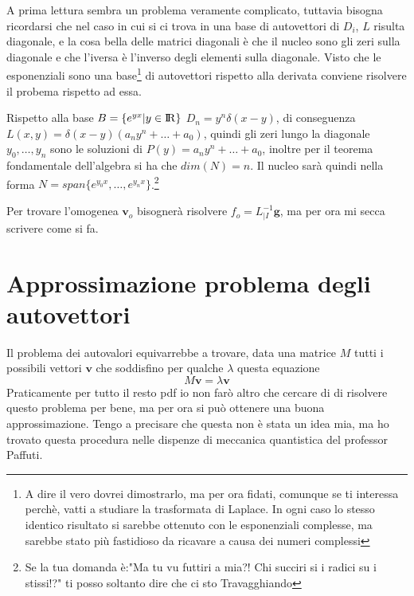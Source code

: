 \documentclass[11pt,a4paper]{report}
\newcommand{\vettore}[1]{\mathbf{#1}}
\theoremstyle{definition}
\theoremstyle{plain}
\theoremstyle{plain}
\begin{document}
			A prima lettura sembra un problema veramente complicato, tuttavia bisogna ricordarsi che nel caso in cui si ci trova in una base di autovettori di $D_i$, $L$ risulta diagonale, e la cosa bella delle matrici diagonali è che il nucleo sono gli zeri sulla diagonale e che l'iversa è l'inverso degli elementi sulla diagonale.\newline
			Visto che le esponenziali sono una base\footnote{A dire il vero dovrei dimostrarlo, ma per ora fidati, comunque se ti interessa perchè, vatti a studiare la trasformata di Laplace. In ogni caso lo stesso identico risultato si sarebbe ottenuto con le esponenziali complesse, ma sarebbe stato più fastidioso da ricavare a causa dei numeri complessi} di autovettori rispetto alla derivata conviene risolvere il probema rispetto ad essa.\newline

			Rispetto alla base $B=\{e^{yx}|y \in \rm I\!R\}$ $D_n=y^n\delta(x-y)$, di conseguenza $L(x,y)=\delta(x-y)(a_ny^n+\dots+a_0)$, quindi gli zeri lungo la diagonale $y_0,\dots,y_n$ sono le soluzioni di $P(y)=a_ny^n+\dots+a_0$, inoltre per il teorema fondamentale dell'algebra si ha che $dim(N)=n$. Il nucleo sarà quindi nella forma $N=span\{e^{y_0x},\dots,e^{y_nx}\}$.\footnote{Se la tua domanda è:"Ma tu vu futtiri a mia?! Chi succiri si i radici su i stissi!?" ti posso soltanto dire che ci sto Travagghiando}\newline

			Per trovare l'omogenea $\vettore v_o$ bisognerà risolvere $f_o=L^{-1}_{|I}\vettore g$, ma per ora mi secca scrivere come si fa.



		\section{Approssimazione problema degli autovettori}
			Il problema dei autovalori equivarrebbe a trovare, data una matrice $M$ tutti i possibili vettori $\vettore v$ che soddisfino per qualche $\lambda$ questa equazione
			\begin{equation}
				M\vettore v=\lambda \vettore v
				\label{eq:autovett1}
			\end{equation}
			Praticamente per tutto il resto pdf io non farò altro che cercare di di risolvere questo problema per bene, ma per ora si può ottenere una buona approssimazione.\newline
			Tengo a precisare che questa non è stata un idea mia, ma ho trovato questa procedura nelle dispenze di meccanica quantistica del professor Paffuti.\newline
\end{document}
